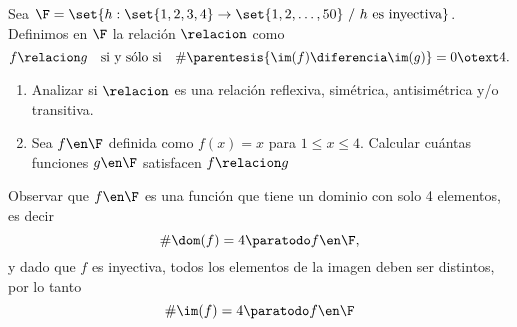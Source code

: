 \ejExtra

Sea
$
  \F = \set{h : \set{1,2,3,4} \to \set{1,2,\dots, 50} \ /\  h \text{ es inyectiva}}
$.\\
Definimos en $\F$ la relación $\relacion$ como
$$
  f \relacion g \quad \text{si y sólo si} \quad \# \parentesis{ \im(f) \diferencia \im(g) } = 0 \otext 4.
$$
\begin{enumerate}[label=\alph*)]
  \item Analizar si $\relacion$ es una relación reflexiva, simétrica, antisimétrica y/o transitiva.

  \item Sea
        $f \en \F$
        definida como $f(x) = x$ para $1 \leq x \leq 4$. Calcular cuántas funciones $g \en \F$
        satisfacen $f \relacion g$
\end{enumerate}

\separadorCorto

Observar que $f \en \F$ es una función que tiene un dominio con solo 4 elementos, es decir
$$
  \# \dom(f) = 4 \paratodo f \en \F,
$$
y dado que $f$ es inyectiva, todos los elementos de la imagen deben ser distintos, por lo tanto
$$
  \# \im(f) = 4 \paratodo f \en \F
$$

